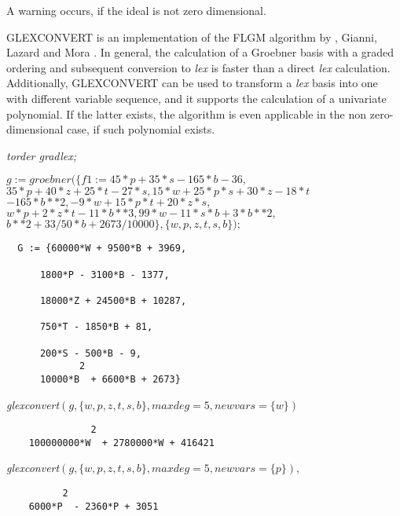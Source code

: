 A warning occurs, if the ideal is not zero dimensional.

GLEXCONVERT is an implementation of the FLGM algorithm by
, {\sc Gianni}, {\sc Lazard} and {\sc
Mora} \cite{Faugere:89}. In general, the calculation of a Groebner basis
with a graded ordering and subsequent conversion to {\it lex} is
faster than a direct {\it lex} calculation. Additionally, GLEXCONVERT
can be used to transform a {\it lex} basis into one with different
variable sequence, and it supports the calculation of a univariate
polynomial. If the latter exists, the algorithm is even applicable in
the non zero-dimensional case, if such polynomial exists.

\example {}

{\it torder gradlex;}

$ g  :=  groebner  (\{ f1 := 45*p + 35*s -165*b -36,$ \\
\hspace*{+1cm} $35*p + 40*z + 25*t - 27*s, 15*w + 25*p*s +30*z -18*t $ \\
\hspace*{+1cm} $-165*b**2, -9*w + 15*p*t  + 20*z*s, $ \\
\hspace*{+1cm} $ w*p + 2*z*t - 11*b**3, 99*w - 11*s*b +3*b**2, $ \\
\hspace*{+1cm} $ b**2 + 33/50*b + 2673/10000\}, \{w,p,z,t,s,b\});$

\begin{verbatim}
  G := {60000*W + 9500*B + 3969,

      1800*P - 3100*B - 1377,

      18000*Z + 24500*B + 10287,

      750*T - 1850*B + 81,

      200*S - 500*B - 9,
             2
      10000*B  + 6600*B + 2673}
\end{verbatim}

{\it
glexconvert}$\left(g,\{w,p,z,t,s,b\},maxdeg=5,newvars=\{w\}\right)$
\begin{verbatim}
               2
    100000000*W  + 2780000*W + 416421
\end{verbatim}

{\it glexconvert}$\left(g,\{w,p,z,t,s,b\},maxdeg=5,
newvars=\{p\}\right),$
\begin{verbatim}
          2
    6000*P  - 2360*P + 3051

\end{verbatim}

